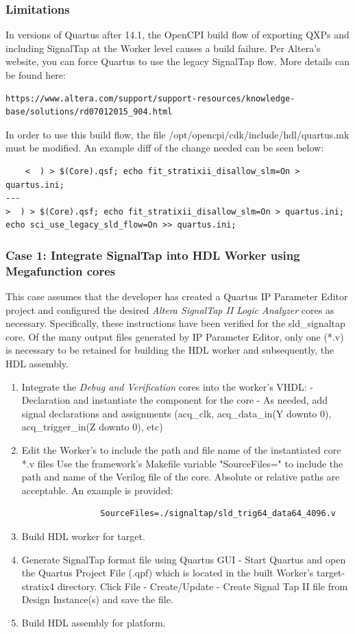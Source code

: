 \begin{flushleft}
	\subsubsection{Limitations}
	In versions of Quartus after 14.1, the OpenCPI build flow of exporting QXPs and including SignalTap at the Worker level causes a build failure. Per Altera's website, you can force Quartus to use the legacy SignalTap flow. More details can be found here: \begin{verbatim}https://www.altera.com/support/support-resources/knowledge-base/solutions/rd07012015_904.html\end{verbatim}
	In order to use this build flow, the file /opt/opencpi/cdk/include/hdl/quartus.mk must be modified. An example diff of the change needed can be seen below:
	\scriptsize\begin{verbatim}
	<  ) > $(Core).qsf; echo fit_stratixii_disallow_slm=On > quartus.ini;
---
>  ) > $(Core).qsf; echo fit_stratixii_disallow_slm=On > quartus.ini; echo sci_use_legacy_sld_flow=On >> quartus.ini;
	\end{verbatim}\normalsize
	\subsubsection{Case 1: Integrate SignalTap into HDL Worker using Megafunction cores}
	This case assumes that the developer has created a Quartus IP Parameter Editor project and configured the desired \textit{Altera SignalTap II Logic Analyzer} cores as necessary. Specifically, these instructions have been verified for the sld\_signaltap core. Of the many output files generated by IP Parameter Editor, only one (*.v) is necessary to be retained for building the HDL worker and subsequently, the HDL assembly.
		\begin{enumerate}
			\item Integrate the \textit{Debug and Verification} cores into the worker's VHDL:
				\subitem - Declaration and instantiate the component for the core
				\subitem - As needed, add signal declarations and assignments (acq\_clk, acq\_data\_in(Y downto 0), acq\_trigger\_in(Z downto 0), etc)
			\item Edit the Worker's  to include the path and file name of the instantiated core *.v files Use the framework's Makefile variable "SourceFiles=" to include the path and	name of the Verilog file of the core. Absolute or relative paths are acceptable. An example is provided:
			\small\begin{verbatim}
				SourceFiles=./signaltap/sld_trig64_data64_4096.v
			\end{verbatim}
		 	\item Build HDL worker for target.
		 	\item Generate SignalTap format file using Quartus GUI
		 		\subitem - Start Quartus and open the Quartus Project File (.qpf) which is located in the built Worker's target-stratix4 directory. Click File - Create/Update - Create Signal Tap II file from Design Instance(s) and save the file.
			\item Build HDL assembly for platform.
		\end{enumerate}


\end{flushleft}
